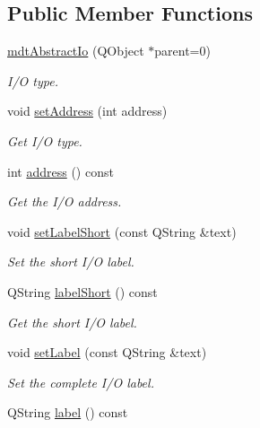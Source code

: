 \subsection*{Public Member Functions}
\begin{DoxyCompactItemize}
\item 
\hyperlink{classmdt_abstract_io_ac138b89890471e0412f2b15f2c53f1f9}{mdtAbstractIo} (QObject $\ast$parent=0)
\begin{DoxyCompactList}\small\item\em I/O type. \end{DoxyCompactList}\item 
void \hyperlink{classmdt_abstract_io_a1f3bfa0472c7e0bd4cd9a5b865c460a2}{setAddress} (int address)
\begin{DoxyCompactList}\small\item\em Get I/O type. \end{DoxyCompactList}\item 
\hypertarget{classmdt_abstract_io_a52f071b6c1098e74f82eade9ead5382a}{
int \hyperlink{classmdt_abstract_io_a52f071b6c1098e74f82eade9ead5382a}{address} () const }
\label{classmdt_abstract_io_a52f071b6c1098e74f82eade9ead5382a}

\begin{DoxyCompactList}\small\item\em Get the I/O address. \end{DoxyCompactList}\item 
void \hyperlink{classmdt_abstract_io_a0f0a70927942f793ce93c7f0c013a39e}{setLabelShort} (const QString \&text)
\begin{DoxyCompactList}\small\item\em Set the short I/O label. \end{DoxyCompactList}\item 
\hypertarget{classmdt_abstract_io_ad6490f8dda6df55cc3d1811348d0155e}{
QString \hyperlink{classmdt_abstract_io_ad6490f8dda6df55cc3d1811348d0155e}{labelShort} () const }
\label{classmdt_abstract_io_ad6490f8dda6df55cc3d1811348d0155e}

\begin{DoxyCompactList}\small\item\em Get the short I/O label. \end{DoxyCompactList}\item 
void \hyperlink{classmdt_abstract_io_ae614f78829c59cb7b7d8265dd59e2164}{setLabel} (const QString \&text)
\begin{DoxyCompactList}\small\item\em Set the complete I/O label. \end{DoxyCompactList}\item 
\hypertarget{classmdt_abstract_io_a8d21d147ce526f9ad9f65bde7c68b7d9}{
QString \hyperlink{classmdt_abstract_io_a8d21d147ce526f9ad9f65bde7c68b7d9}{label} () const }
\label{classmdt_abstract_io_a8d21d147ce526f9ad9f65bde7c68b7d9}


\end{DoxyCompactItemize}
